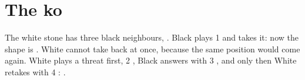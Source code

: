 \documentclass[border=0.5cm, varwidth=12cm]{standalone}
\begin{document}
	\section*{The ko}
	\begin{pgfgolayout}[columns = 3, fit]
		\begin{goban}[5, name = before]
		\end{goban}
		\begin{goban}[5, name = capture, captures]
		\end{goban}
		\begin{goban}[5, name = retake, captures]
		\end{goban}
	\end{pgfgolayout}

	\medskip
	The white stone \pgfgostone[w, mark = triangle] has three black neighbours,
	.
	Black plays 1  and takes it:
	now the shape is . White cannot take back at once, because the
	same position would come again. White plays a threat first, 2 ,
	Black answers with 3 , and only then White retakes with 4
	: .
\end{document}
